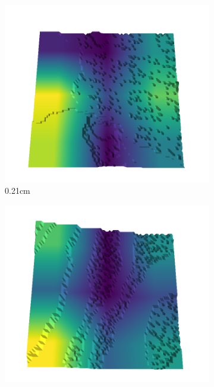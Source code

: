 \documentclass[../document.tex]{subfiles}
\begin{document}
\begin{figure}[H]
    \centering
    \begin{subfigure}[b]{0.242\linewidth}
    \includegraphics[width=\linewidth]{../img/5/quarry/best/21-patch-3d-majavi-colormap-0.png}
    \caption{0.21cm}
    \end{subfigure}
    \begin{subfigure}[b]{0.242\linewidth}
    \includegraphics[width=\linewidth]{../img/5/quarry/best/31-patch-3d-majavi-colormap-5.png}

\end{subfigure}
\end{figure}
\end{document}

